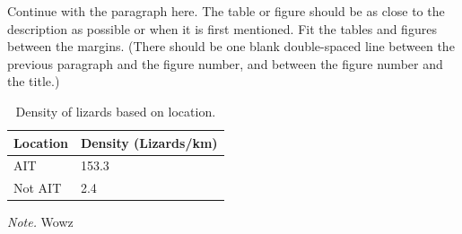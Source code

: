 Continue with the paragraph here.  The table or figure should be as close to the description as possible or when it is first mentioned. Fit the tables and figures between the margins.
(There should be one blank double-spaced line between the previous paragraph and the figure number, and between the figure number and the title.)

\begin{table}[]
\caption{Density of lizards based on location.}
\begin{center}
\begin{tabular}{|l|l|}
\hline
Location & Density (Lizards/km) \\ \hline
AIT      & 153.3                \\ \hline
Not AIT  & 2.4                  \\ \hline
\end{tabular}
\label{tab:dense}
\end{center}
\textit{Note.} Wowz
\end{table}
